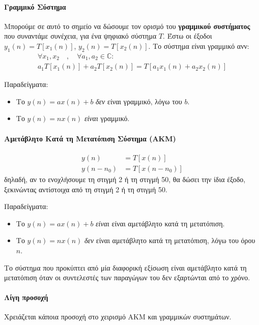 \documentclass[11pt,a4paper,notitlepage,fleqn]{article}
\begin{document}
\paragraph{Γραμμικό Σύστημα}
Μπορούμε σε αυτό το σημείο να δώσουμε τον ορισμό του \textbf{γραμμικού συστήματος} που συναντάμε συνέχεια,
για ένα ψηφιακό σύστημα \( T \). Έστω οι έξοδοι \( y_1(n) = T\left[x_1(n)\right] \),
\( y_2(n) = T\left[x_2(n)\right] \). Το σύστημα είναι γραμμικό ανν:
\begin{gather*}
\forall x_1,x_2\quad,\quad \forall a_1,a_2\in\mathbb C:\\
a_1T\left[x_1(n)\right]+a_2T\left[x_2(n)\right] = T\left[a_1x_1(n)+a_2x_2(n)\right]
\end{gather*}

Παραδείγματα:
\begin{itemize}
	\item Το \( y(n) = ax(n) + b \) \textit{δεν} είναι γραμμικό, λόγω του \( b \).
	\item Το \( y(n) = nx(n) \) \textit{είναι} γραμμικό.
\end{itemize}

\paragraph{Αμετάβλητο Κατά τη Μετατόπιση Σύστημα (ΑΚΜ)}
\begin{align*}
	y(n) &= T\left[x(n)\right] \\
	y(n-n_0) &= T\left[x(n-n_0)\right]
\end{align*}
δηλαδή, αν το ενοχλήσουμε τη στιγμή 2 ή τη στιγμή 50, θα δώσει την ίδια έξοδο, ξεκινώντας αντίστοιχα
από τη στιγμή 2 ή τη στιγμή 50.

Παραδείγματα:
\begin{itemize}
	\item Το \( y(n) = ax(n) + b \) \textit{είναι} είναι αμετάβλητο κατά τη μετατόπιση.
	\item Το \( y(n) = nx(n) \) \textit{δεν} είναι αμετάβλητο κατά τη μετατόπιση, λόγω του όρου \( n \).
\end{itemize}

Το σύστημα που προκύπτει από μία διαφορική εξίσωση είναι αμετάβλητο κατά τη μετατόπιση όταν οι συντελεστές των παραγώγων του δεν εξαρτώνται από το χρόνο.

\paragraph{Λίγη προσοχή}
Χρειάζεται κάποια προσοχή στο χειρισμό ΑΚΜ και γραμμικών συστημάτων.
\end{document}
